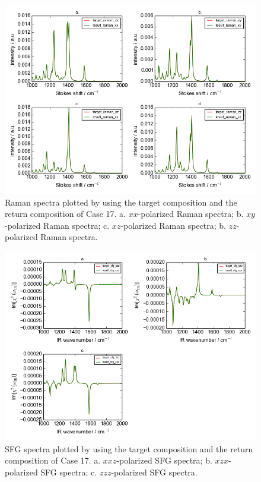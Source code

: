 \begin{figure}[!ht] 
\centering
\includegraphics[scale=0.7]{Figures/chapter4_result_target_plotting_5datapoint_raman_version2.png}
\caption{Raman spectra plotted by using the target composition and the return composition of Case 17. a. $xx$-polarized Raman spectra; b. $xy$-polarized Raman spectra; c. $xz$-polarized Raman spectra; b. $zz$-polarized Raman spectra.} \label{fig:4.3}
\end{figure}

\begin{figure}[!ht]
\centering
\includegraphics[scale=0.7]{Figures/chapter4_result_target_plotting_5datapoint_sfg_version2.png}
\caption{SFG spectra plotted by using the target composition and the return composition of Case 17. a. $xxz$-polarized SFG spectra; b. $xzx$-polarized SFG spectra; c. $zzz$-polarized SFG spectra.}  \label{fig:4.4}
\end{figure}

